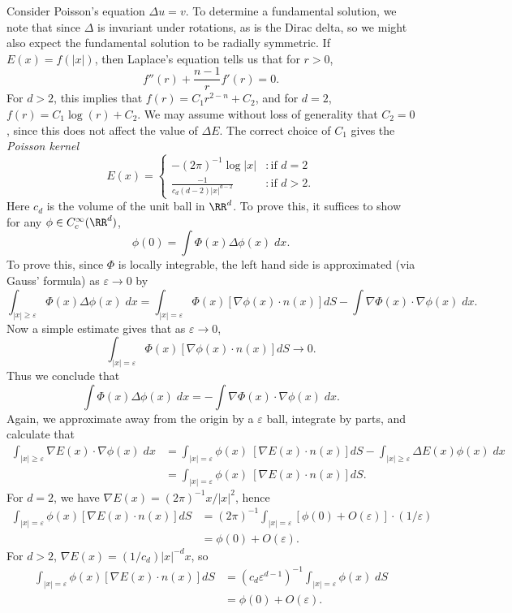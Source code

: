 \begin{example}
    Consider Poisson's equation $\Delta u = v$. To determine a fundamental solution, we note that since $\Delta$ is invariant under rotations, as is the Dirac delta, so we might also expect the fundamental solution to be radially symmetric. If $E(x) = f(|x|)$, then Laplace's equation tells us that for $r > 0$,
    \[ f''(r) + \frac{n-1}{r} f'(r) = 0. \]
    For $d > 2$, this implies that $f(r) = C_1 r^{2-n} + C_2$, and for $d = 2$, $f(r) = C_1 \log(r) + C_2$. We may assume without loss of generality that $C_2 = 0$, since this does not affect the value of $\Delta E$. The correct choice of $C_1$ gives the \emph{Poisson kernel}
    \[ E(x) = \begin{cases} - (2\pi)^{-1} \log |x| &: \text{if $d = 2$} \\ \frac{-1}{c_d (d-2) |x|^{d-2}} &: \text{if $d > 2$.} \end{cases} \]
    Here $c_d$ is the volume of the unit ball in $\RR^d$. To prove this, it suffices to show for any $\phi \in C_c^\infty(\RR^d)$,
    \[ \phi(0) = \int \Phi(x) \Delta \phi(x)\; dx. \]
    To prove this, since $\Phi$ is locally integrable, the left hand side is approximated (via Gauss' formula) as $\varepsilon \to 0$ by
    \[ \int_{|x| \geq \varepsilon} \Phi(x) \Delta \phi(x)\; dx = \int_{|x| = \varepsilon} \Phi(x) [\nabla \phi(x) \cdot n(x)] dS - \int \nabla \Phi(x) \cdot \nabla \phi(x)\; dx. \]
    Now a simple estimate gives that as $\varepsilon \to 0$,
    \[ \int_{|x| = \varepsilon} \Phi(x) [\nabla \phi(x) \cdot n(x)] dS \to 0. \]
    Thus we conclude that
    \[ \int \Phi(x) \Delta \phi(x)\; dx = - \int \nabla \Phi(x) \cdot \nabla \phi(x)\; dx. \]
    Again, we approximate away from the origin by a $\varepsilon$ ball, integrate by parts, and calculate that
    \begin{align*}
        \int_{|x| \geq \varepsilon} \nabla E(x) \cdot \nabla \phi(x)\; dx &= \int_{|x| = \varepsilon} \phi(x)\ [\nabla E(x) \cdot n(x)] dS - \int_{|x| \geq \varepsilon} \Delta E(x) \phi(x)\; dx\\
        &= \int_{|x| = \varepsilon} \phi(x)\ [\nabla E(x) \cdot n(x)] dS.
    \end{align*}
    For $d = 2$, we have $\nabla E(x) = (2 \pi)^{-1} x/|x|^2$, hence
    \begin{align*}
        \int_{|x| = \varepsilon} \phi(x) [\nabla E(x) \cdot n(x)] dS &= (2 \pi)^{-1} \int_{|x| = \varepsilon} [\phi(0) + O(\varepsilon)] \cdot (1/\varepsilon)\\
        &= \phi(0) + O(\varepsilon).
    \end{align*}
    For $d > 2$, $\nabla E(x) = (1/c_d) |x|^{-d} x$, so
    \begin{align*}
        \int_{|x| = \varepsilon} \phi(x) [\nabla E(x) \cdot n(x)] dS &= (c_d \varepsilon^{d-1})^{-1} \int_{|x| = \varepsilon} \phi(x)\; dS\\
        &= \phi(0) + O(\varepsilon).
    \end{align*}
\end{example}

